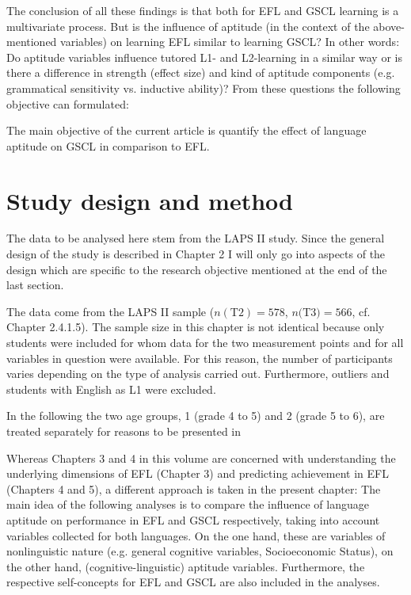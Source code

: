 \documentclass[output=paper]{langsci/langscibook}
\begin{document}
The conclusion of all these findings is that both for EFL and GSCL learning is a multivariate process. But is the influence of aptitude (in the context of the above-mentioned variables) on learning EFL similar to learning GSCL? In other words: Do aptitude variables influence tutored L1- and L2-learning in a similar way or is there a difference in strength (effect size) and kind of aptitude components (e.g. grammatical sensitivity vs. inductive ability)? From these questions the following objective can formulated:

The main objective of the current article is quantify the effect of language aptitude on GSCL in comparison to EFL. 

\section{Study design and method}

The data to be analysed here stem from the LAPS II study. Since the general design of the study is described in Chapter 2 I will only go into aspects of the design which are specific to the research objective mentioned at the end of the last section. 

The data come from the LAPS II sample ($n(\text{T2})=578$, $n\text{(T3)}= 566$, cf. Chapter 2.4.1.5). The sample size in this chapter is not identical because only students were included for whom data for the two measurement points and for all variables in question were available. For this reason, the number of participants varies depending on the type of analysis carried out. Furthermore, outliers and students with English as L1 were excluded.

In the following the two age groups, 1 (grade 4 to 5) and 2 (grade 5 to 6), are treated separately for reasons to be presented in 

Whereas Chapters 3 and 4 in this volume are concerned with understanding the underlying dimensions of EFL (Chapter 3) and predicting achievement in EFL (Chapters 4 and 5), a different approach is taken in the present chapter: The main idea of the following analyses is to compare the influence of language aptitude on performance in EFL and GSCL respectively, taking into account variables collected for both languages. On the one hand, these are variables of nonlinguistic nature (e.g. general cognitive variables, Socioeconomic Status), on the other hand, (cognitive-linguistic) aptitude variables. Furthermore, the respective self-concepts for EFL and GSCL are also included in the analyses.
\end{document}
